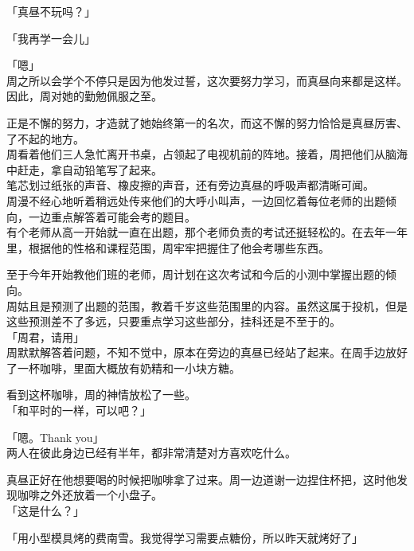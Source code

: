 「真昼不玩吗？」

「我再学一会儿」

「嗯」\\

周之所以会学个不停只是因为他发过誓，这次要努力学习，而真昼向来都是这样。因此，周对她的勤勉佩服之至。

正是不懈的努力，才造就了她始终第一的名次，而这不懈的努力恰恰是真昼厉害、了不起的地方。\\

周看着他们三人急忙离开书桌，占领起了电视机前的阵地。接着，周把他们从脑海中赶走，拿自动铅笔写了起来。\\

笔芯划过纸张的声音、橡皮擦的声音，还有旁边真昼的呼吸声都清晰可闻。\\

周漫不经心地听着稍远处传来他们的大呼小叫声，一边回忆着每位老师的出题倾向，一边重点解答着可能会考的题目。\\

有个老师从高一开始就一直在出题，那个老师负责的考试还挺轻松的。在去年一年里，根据他的性格和课程范围，周牢牢把握住了他会考哪些东西。

至于今年开始教他们班的老师，周计划在这次考试和今后的小测中掌握出题的倾向。\\

周姑且是预测了出题的范围，教着千岁这些范围里的内容。虽然这属于投机，但是这些预测差不了多远，只要重点学习这些部分，挂科还是不至于的。\\

「周君，请用」\\

周默默解答着问题，不知不觉中，原本在旁边的真昼已经站了起来。在周手边放好了一杯咖啡，里面大概放有奶精和一小块方糖。

看到这杯咖啡，周的神情放松了一些。\\

「和平时的一样，可以吧？」

「嗯。Thank you」\\

两人在彼此身边已经有半年，都非常清楚对方喜欢吃什么。

真昼正好在他想要喝的时候把咖啡拿了过来。周一边道谢一边捏住杯把，这时他发现咖啡之外还放着一个小盘子。\\

「这是什么？」

「用小型模具烤的费南雪。我觉得学习需要点糖份，所以昨天就烤好了」\\

